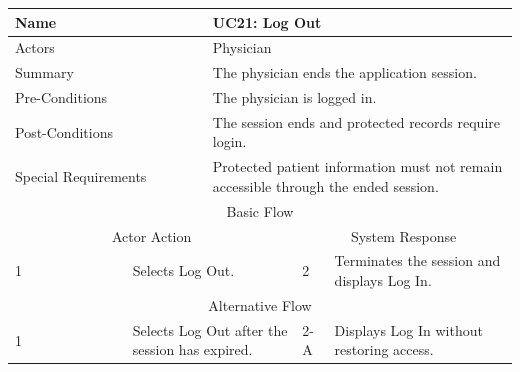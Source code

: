 \begin{reporttable}
\centering
\small
\caption{UC21: Log Out.}
\label{tab:kashaf:uc21}
\begin{tabular}{|p{}|p{}|p{}|p{}|p{}|}
\hline
\multicolumn{2}{|p{\dimexpr0.225\textwidth+2\tabcolsep+\arrayrulewidth\relax}|}{Name} & \multicolumn{3}{p{\dimexpr0.575\textwidth+4\tabcolsep+2\arrayrulewidth\relax}|}{UC21: Log Out} \\ \hline
\multicolumn{2}{|p{\dimexpr0.225\textwidth+2\tabcolsep+\arrayrulewidth\relax}|}{Actors} & \multicolumn{3}{p{\dimexpr0.575\textwidth+4\tabcolsep+2\arrayrulewidth\relax}|}{Physician} \\ \hline
\multicolumn{2}{|p{\dimexpr0.225\textwidth+2\tabcolsep+\arrayrulewidth\relax}|}{Summary} & \multicolumn{3}{p{\dimexpr0.575\textwidth+4\tabcolsep+2\arrayrulewidth\relax}|}{The physician ends the application session.} \\ \hline
\multicolumn{2}{|p{\dimexpr0.225\textwidth+2\tabcolsep+\arrayrulewidth\relax}|}{Pre-Conditions} & \multicolumn{3}{p{\dimexpr0.575\textwidth+4\tabcolsep+2\arrayrulewidth\relax}|}{The physician is logged in.} \\ \hline
\multicolumn{2}{|p{\dimexpr0.225\textwidth+2\tabcolsep+\arrayrulewidth\relax}|}{Post-Conditions} & \multicolumn{3}{p{\dimexpr0.575\textwidth+4\tabcolsep+2\arrayrulewidth\relax}|}{The session ends and protected records require login.} \\ \hline
\multicolumn{2}{|p{\dimexpr0.225\textwidth+2\tabcolsep+\arrayrulewidth\relax}|}{Special Requirements} & \multicolumn{3}{p{\dimexpr0.575\textwidth+4\tabcolsep+2\arrayrulewidth\relax}|}{Protected patient information must not remain accessible through the ended session.} \\ \hline
\multicolumn{5}{|c|}{Basic Flow} \\ \hline
\multicolumn{3}{|c|}{Actor Action} & \multicolumn{2}{c|}{System Response} \\ \hline
1 & \multicolumn{2}{p{\dimexpr0.37\textwidth+2\tabcolsep+\arrayrulewidth\relax}|}{Selects Log Out.} & 2 & Terminates the session and displays Log In. \\ \hline
\multicolumn{5}{|c|}{Alternative Flow} \\ \hline
1 & \multicolumn{2}{p{\dimexpr0.37\textwidth+2\tabcolsep+\arrayrulewidth\relax}|}{Selects Log Out after the session has expired.} & 2-A & Displays Log In without restoring access. \\ \hline
\end{tabular}
\end{reporttable}




